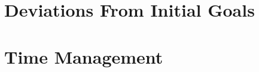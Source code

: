 

\section{Deviations From Initial Goals} %
\label{sec:deviations_from_initial_goals}



\section{Time Management} %
\label{sec:time_management}


